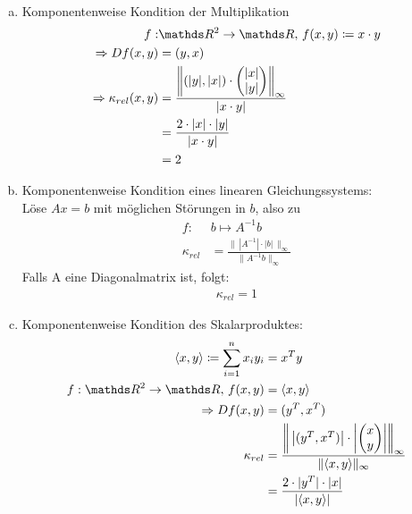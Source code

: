\begin{Bspe}~
  \begin{enumerate}[a)]
  \item Komponentenweise Kondition der Multiplikation
    \begin{align*}
      f:&\R^2 \rightarrow \R, \, f(x,y) \coloneqq x\cdot y \\
      \Rightarrow Df(x,y) &= (y, x)  \\
      \Rightarrow \kappa_{rel}(x,y) &= \frac{\left\| (|y|, |x|)\cdot \begin{pmatrix}
            |x| \\
            |y|
          \end{pmatrix}\right\|_\infty}
      {|x\cdot y|} \\
        &= \frac{2\cdot|x|\cdot |y|}{|x\cdot y|} \\
        &= 2
    \end{align*}
  \item Komponentenweise Kondition eines linearen Gleichungssystems:\\
    Löse $Ax=b$ mit möglichen Störungen in $b$, also zu
    \begin{align*}
      f: & b\mapsto A^{-1}b \\
      \kappa_{rel} & = \frac{\| \, |A^{-1}| \cdot |b|\, \|_\infty}{\|A^{-1}b\|_\infty}
    \end{align*}
    Falls A eine Diagonalmatrix ist, folgt:
    \begin{gather*}
      \kappa_{rel}=1
    \end{gather*}
  \item Komponentenweise Kondition des Skalarproduktes:
    \begin{align*}
      \langle x,y \rangle \coloneqq \sum_{i=1}^{n}x_i y_i& = x^Ty \\
      f: \R^2 \rightarrow \R, \, f(x,y) &= \langle x,y \rangle \\
      \Rightarrow Df(x,y) &= (y^T, x^T) \\
      \kappa_{rel}  &= \frac{\left\| \,\left|(y^T, x^T)\right|\cdot\left|\begin{pmatrix}
              x \\
              y
            \end{pmatrix}\right|\right\|_\infty }
      {\|\langle x,y\rangle\|_\infty}\\
                                                         &= \frac{2\cdot |y^T|\cdot |x|}{|\langle x,y\rangle|} \\

\end{align*}
\end{enumerate}
\end{Bspe}
